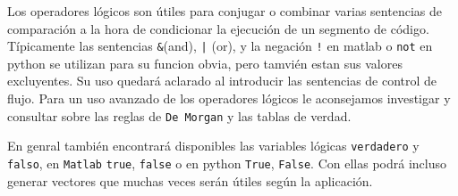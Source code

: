 Los operadores lógicos son útiles para conjugar o combinar varias sentencias de 
comparación a la hora de condicionar la ejecución de un segmento de código. 
Típicamente las sentencias \texttt{&}(and), \texttt{|} (or), y la negación \texttt{!} en matlab 
o \texttt{not} en python se utilizan para su funcion obvia, pero tamvién estan sus 
valores excluyentes. Su uso quedará aclarado al introducir las sentencias de control de flujo.
Para un uso avanzado de los operadores lógicos le aconsejamos investigar y consultar
sobre las reglas de \texttt{De Morgan} y las tablas de verdad.

En genral también encontrará disponibles las variables lógicas \texttt{verdadero} y 
\texttt{falso}, en \texttt{Matlab} \texttt{true}, \texttt{false} o en python 
\texttt{True}, \texttt{False}. Con ellas podrá incluso generar vectores que 
muchas veces serán útiles según la aplicación.

